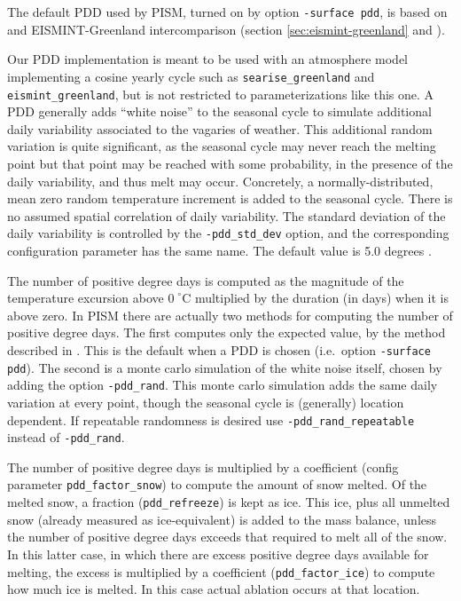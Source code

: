 \documentclass[titlepage,letterpaper,final]{scrartcl}
\newcommand{\intextoption}[1]{\texttt{-#1}\optindex{\texttt{-#1}}}
\begin{document}
The default PDD used by PISM, turned on by option \texttt{-surface pdd}, is
based on \cite{CalovGreve05} and EISMINT-Greenland intercomparison (section
\ref{sec:eismint-greenland} and \cite{RitzEISMINT}).

Our PDD implementation is meant to be used with an atmosphere model
implementing a cosine yearly cycle such as \texttt{searise_greenland} and
\texttt{eismint_greenland}, but is not restricted to parameterizations like
this one. A PDD generally adds ``white noise'' to the seasonal cycle to
simulate additional daily variability associated to the vagaries of weather.
This additional random variation is quite significant, as the seasonal cycle
may never reach the melting point but that point may be reached with some
probability, in the presence of the daily variability, and thus melt may occur.
Concretely, a normally-distributed, mean zero random temperature increment is
added to the seasonal cycle. There is no assumed spatial correlation of daily
variability. The standard deviation of the daily variability is controlled by
the \intextoption{pdd_std_dev} option, and the corresponding configuration
parameter has the same name. The default value is 5.0 degrees
\cite{RitzEISMINT}.

The number of positive degree days is computed as the magnitude of the
temperature excursion above $0\!\phantom{|}^\circ \text{C}$ multiplied by the
duration (in days) when it is above zero. In PISM there are actually two
methods for computing the number of positive degree days. The first computes
only the expected value, by the method described in \cite{CalovGreve05}. This
is the default when a PDD is chosen (i.e.~option \texttt{-surface pdd}). The
second is a monte carlo simulation of the white noise itself, chosen by adding
the option \intextoption{pdd_rand}. This monte carlo simulation adds the same
daily variation at every point, though the seasonal cycle is (generally)
location dependent. If repeatable randomness is desired use
\intextoption{pdd_rand_repeatable} instead of \texttt{-pdd_rand}.

The number of positive degree days is multiplied by a coefficient (config
parameter \texttt{pdd_factor_snow}) to compute the amount of snow melted. Of
the melted snow, a fraction (\texttt{pdd_refreeze}) is kept as ice. This ice,
plus all unmelted snow (already measured as ice-equivalent) is added to the
mass balance, unless the number of positive degree days exceeds that required
to melt all of the snow. In this latter case, in which there are excess
positive degree days available for melting, the excess is multiplied by a
coefficient (\texttt{pdd_factor_ice}) to compute how much ice is melted. In
this case actual ablation occurs at that location.
\end{document}
